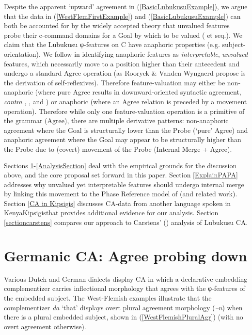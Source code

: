 \documentclass[output=paper
,modfonts
,nonflat
]{langsci/langscibook}
\begin{document}
Despite the apparent `upward' agreement in (\ref{BasicLubukusuExample}), we argue that the data in (\ref{WestFlemFirstExample}) and (\ref{BasicLubukusuExample}) can both be accounted for by the widely accepted theory that unvalued features probe their c-command domains for a Goal by which to be valued (\citealt{Chomsky:2000} et seq.).  We claim that the Lubukusu φ-features on C have anaphoric properties (e.g. subject-orientation). We follow \citet{Rooryck:2011} in identifying anaphoric features as \textit{interpretable}, \textit{unvalued} features, which necessarily move to a position higher than their antecedent and undergo a standard Agree operation (as Rooryck \& Vanden Wyngaerd \citeyear{Rooryck:2011} propose is the derivation of self-reflexives). Therefore feature-valuation may either be non-anaphoric (where pure Agree results in downward-oriented syntactic agreement, \textit{contra} \citealt{Zeijlstra:2012}, \citealt{Wurmbrand:2011}, and \citealt{Bjorkman:toappearb}) or anaphoric (where an Agree relation 
is preceded by a movement operation). Therefore while only one feature-valuation operation is a primitive of the grammar (Agree), there are multiple derivative patterns: non-anaphoric agreement where the Goal is structurally lower than the Probe (`pure' Agree) and anaphoric agreement where the Goal may appear to be structurally higher than the Probe due to (covert) movement of the Probe (Internal Merge + Agree). 

Sections \ref{GermanicCA}-\ref{AnalysisSection} deal with the empirical grounds for the discussion above, and the core proposal set forward in this paper. Section \ref{ExplainPAPA} addresses why unvalued yet interpretable features should undergo internal merge by linking this movement to the Phase Reference model of \citet{Hinzen:2012} (and related work). Section \ref{CA in Kipsigis} discusses CA-data from another language spoken in Kenya\textemdash Kipsigis\textemdash that provides additional evidence for our analysis. Section \ref{sectioncarstens} compares our approach to Carstens' (\citeyear{Carstens:2016}) analysis of Lubukusu CA.

\section{Germanic CA: Agree probing down} \label{GermanicCA}

Various Dutch and German dialects display CA in which a declarative-embedding complementizer carries inflectional morphology that agrees with the φ-features of the embedded subject. The West-Flemish examples illustrate that the complementizer \textit{da} `that' displays overt plural agreement morphology (\textit{–n}) when there is a plural embedded subject, shown in (\ref{WestFlemishPluralAgr}) (with no overt agreement otherwise). 
\end{document}
